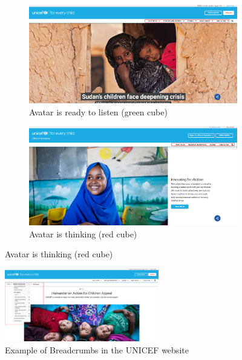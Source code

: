 \begin{figure}[h]
    \centering
	\begin{subfigure}[b]{0.40\textwidth}
        \centering
        \includegraphics[width=\textwidth]{img/critical_heuristics/MN1a.png}
        \caption{Avatar is ready to listen (green cube)}
        \label{fig:greenlight}
    \end{subfigure}
    \hfill
    \begin{subfigure}[b]{0.40\textwidth}
        \centering
        \includegraphics[width=\textwidth]{img/critical_heuristics/MN1b.png}
        \caption{Avatar is thinking (red cube)}
        \label{fig:redlight}
    \end{subfigure}
\end{figure}

\begin{figure}[h]
	\centering
	\includegraphics[width=0.6\textwidth]{img/critical_heuristics/MN2.png}
	\caption{Example of Breadcrumbs in the UNICEF website}
	\label{fig:N1.2}
\end{figure}

